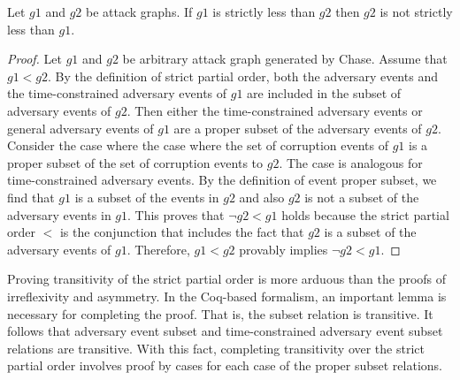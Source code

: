 \documentclass[runningheads]{llncs}
\theoremstyle{definition}
\begin{document}
\begin{theorem}
    Let $g1$ and $g2$ be attack graphs. If $g1$ is strictly less than $g2$ then $g2$ is not strictly less than $g1$. 
\end{theorem}
\begin{proof}
    Let $g1$ and $g2$ be arbitrary attack graph generated by Chase. Assume that $g1 < g2$. By the definition of strict partial order, both the adversary events and the time-constrained adversary events of $g1$ are included in the subset of adversary events of $g2$. Then either the time-constrained adversary events or general adversary events of $g1$ are a proper subset of the adversary events of $g2$. Consider the case where the case where the set of corruption events of $g1$ is a proper subset of the set of corruption events to $g2$. The case is analogous for time-constrained adversary events.  By the definition of event proper subset, we find that $g1$ is a subset of the events in $g2$ and also $g2$ is not a subset of the adversary events in $g1$. This proves that $\neg g2 < g1$ holds because the strict partial order $<$ is the conjunction that includes the fact that $g2$ is a subset of the adversary events of $g1$. Therefore, $g1 < g2$ provably implies $\neg g2 < g1$. 
\end{proof}

\noindent Proving transitivity of the strict partial order is more arduous than the proofs of irreflexivity and asymmetry. In the Coq-based formalism, an important lemma is necessary for completing the proof. That is, the subset relation is transitive. It follows that adversary event subset and time-constrained adversary event subset relations are transitive. With this fact, completing transitivity over the strict partial order involves proof by cases for each case of the proper subset relations.
\end{document}

